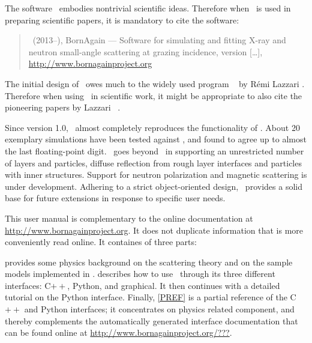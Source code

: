 The software \BornAgain\ embodies nontrivial scientific ideas.
Therefore when \BornAgain\ is used in preparing scientific papers,
it is mandatory to cite the software:
%
\begin{quote}
\authors\ (2013--\the\year),\newline
BornAgain --- Software for simulating and fitting
X-ray and neutron small-angle scattering at grazing incidence,
version [\ldots],\newline
\url{http://www.bornagainproject.org}
\end{quote}
The initial design of \BornAgain\ owes much
to the widely used program \IsGISAXS\
%
%
by R\'emi Lazzari \cite{Laz02,Laz08}.
Therefore when using \BornAgain\ in scientific work,
it might be appropriate to also cite the pioneering papers
by Lazzari \etal\ \cite{Laz02,ReLL09}.

Since version 1.0, \BornAgain\
almost completely reproduces the functionality
of \IsGISAXS.
About 20 exemplary simulations have been tested against \IsGISAXS,
and found to agree up to almost the last floating-point digit.
\BornAgain\ goes beyond \IsGISAXS\
in supporting an unrestricted number of layers and particles,
diffuse reflection from rough layer interfaces and
particles with inner structures.
Support for neutron polarization and magnetic scattering
is under development.
Adhering to a strict object-oriented design,
\BornAgain\ provides a solid base for future extensions
in response to specific user needs.



This user manual is complementary to the online documentation
at \url{http://www.bornagainproject.org}.
It does not duplicate information that is more conveniently read online.
It containes of three parts:

\Cref{PPHYS} provides some physics background
on the scattering theory and on the sample models implemented in \BornAgain.
 describes how to use \BornAgain\ through its three different interfaces:
C$++$, Python, and graphical.
It then continues with a detailed tutorial on the Python interface.
Finally, \cref{PREF} is a partial reference of the C$++$ and Python interfaces;
it concentrates on physics related component,
and thereby complements the automatically generated interface documentation
that can be found online at \url{http://www.bornagainproject.org/???}. %

